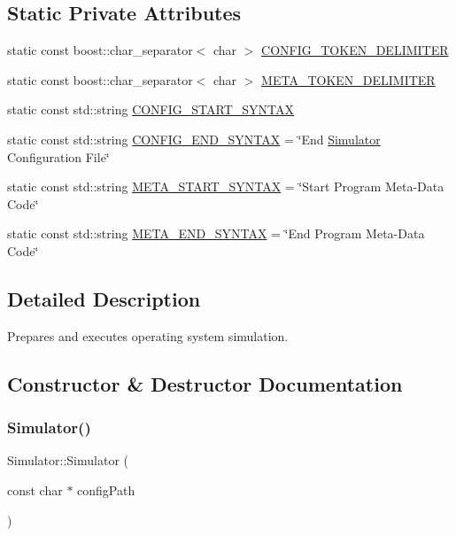\subsection*{Static Private Attributes}
\begin{DoxyCompactItemize}
\item 
static const boost\+::char\+\_\+separator$<$ char $>$ \hyperlink{class_simulator_af589419d1bbe6d3e516836252fcc3694}{C\+O\+N\+F\+I\+G\+\_\+\+T\+O\+K\+E\+N\+\_\+\+D\+E\+L\+I\+M\+I\+T\+ER}
\item 
static const boost\+::char\+\_\+separator$<$ char $>$ \hyperlink{class_simulator_a6c36f9f56a6286593ad414bfc9d2d015}{M\+E\+T\+A\+\_\+\+T\+O\+K\+E\+N\+\_\+\+D\+E\+L\+I\+M\+I\+T\+ER}
\item 
static const std\+::string \hyperlink{class_simulator_adaa721df0fa68ec8257b20b39b78f8ae}{C\+O\+N\+F\+I\+G\+\_\+\+S\+T\+A\+R\+T\+\_\+\+S\+Y\+N\+T\+AX}
\item 
static const std\+::string \hyperlink{class_simulator_ae875eb33920f03c59e4c9a290b77c09a}{C\+O\+N\+F\+I\+G\+\_\+\+E\+N\+D\+\_\+\+S\+Y\+N\+T\+AX} = \char`\"{}End \hyperlink{class_simulator}{Simulator} Configuration File\char`\"{}
\item 
static const std\+::string \hyperlink{class_simulator_ada63d5f4468a4265417286a0fb4ec0bb}{M\+E\+T\+A\+\_\+\+S\+T\+A\+R\+T\+\_\+\+S\+Y\+N\+T\+AX} = \char`\"{}Start Program Meta-\/Data Code\char`\"{}
\item 
static const std\+::string \hyperlink{class_simulator_a91ee5a9047af12c49f4db088acb077f2}{M\+E\+T\+A\+\_\+\+E\+N\+D\+\_\+\+S\+Y\+N\+T\+AX} = \char`\"{}End Program Meta-\/Data Code\char`\"{}
\end{DoxyCompactItemize}


\subsection{Detailed Description}
Prepares and executes operating system simulation. 

\subsection{Constructor \& Destructor Documentation}
\hypertarget{class_simulator_a5511e015f97c2695d3bfb5e003ab4d76}{}\label{class_simulator_a5511e015f97c2695d3bfb5e003ab4d76} 
\subsubsection{\texorpdfstring{Simulator()}{Simulator()}}
{\footnotesize\ttfamily Simulator\+::\+Simulator (\begin{DoxyParamCaption}\item[{const char $\ast$}]{config\+Path }\end{DoxyParamCaption})}



